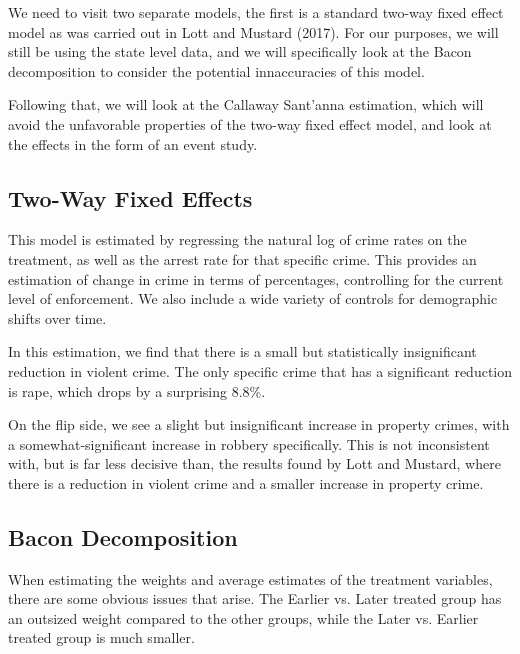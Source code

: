 \documentclass{article}
\begin{document}
We need to visit two separate models, the first is a standard two-way fixed effect model as was carried out in Lott and Mustard (2017). For our purposes, we will still be using the state level data, and we will specifically look at the Bacon decomposition to consider the potential innaccuracies of this model.

Following that, we will look at the Callaway Sant'anna estimation, which will avoid the unfavorable properties of the two-way fixed effect model, and look at the effects in the form of an event study.

\subsection{Two-Way Fixed Effects}

This model is estimated by regressing the natural log of crime rates on the treatment, as well as the arrest rate for that specific crime. This provides an estimation of change in crime in terms of percentages, controlling for the current level of enforcement. We also include a wide variety of controls for demographic shifts over time.





In this estimation, we find that there is a small but statistically insignificant reduction in violent crime. The only specific crime that has a significant reduction is rape, which drops by a surprising 8.8\%. 

On the flip side, we see a slight but insignificant increase in property crimes, with a somewhat-significant increase in robbery specifically. This is not inconsistent with, but is far less decisive than, the results found by Lott and Mustard, where there is a reduction in violent crime and a smaller increase in property crime.

\subsection{Bacon Decomposition}

When estimating the weights and average estimates of the treatment variables, there are some obvious issues that arise. The Earlier vs. Later treated group has an outsized weight compared to the other groups, while the Later vs. Earlier treated group is much smaller. 


\end{document}
